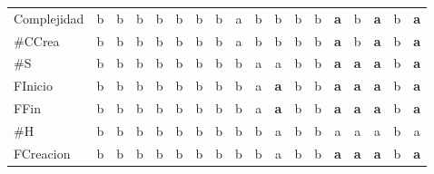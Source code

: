 {\begin{longtable}{lccccccccccccccccc}
Complejidad & \color{grisclaro}b & \color{grisclaro}b & \color{grisclaro}b & \color{grisclaro}b & \color{grisclaro}b & \color{grisclaro}b & \color{grisclaro}b & a & \color{grisclaro}b & \color{grisclaro}b & \color{grisclaro}b & \color{grisclaro}b & \textbf{\color{azuldos}a} & \color{grisclaro}b & \textbf{\color{azuldos}a} & \color{grisclaro}b & \textbf{\color{azuldos}a} \\
\#CCrea & \color{grisclaro}b & \color{grisclaro}b & \color{grisclaro}b & \color{grisclaro}b & \color{grisclaro}b & \color{grisclaro}b & \color{grisclaro}b & a & \color{grisclaro}b & \color{grisclaro}b & \color{grisclaro}b & \color{grisclaro}b & \textbf{\color{azuldos}a} & \color{grisclaro}b & \textbf{\color{azuldos}a} & \color{grisclaro}b & \textbf{\color{azuldos}a} \\
\#S & \color{grisclaro}b & \color{grisclaro}b & \color{grisclaro}b & \color{grisclaro}b & \color{grisclaro}b & \color{grisclaro}b & \color{grisclaro}b & \color{grisclaro}b & a & a & \color{grisclaro}b & \color{grisclaro}b & \textbf{\color{azuldos}a} & \textbf{\color{azuldos}a} & \textbf{\color{azuldos}a} & \color{grisclaro}b & \textbf{\color{azuldos}a} \\
FInicio & \color{grisclaro}b & \color{grisclaro}b & \color{grisclaro}b & \color{grisclaro}b & \color{grisclaro}b & \color{grisclaro}b & \color{grisclaro}b & \color{grisclaro}b & a & \textbf{\color{azuldos}a} & \color{grisclaro}b & \color{grisclaro}b & \textbf{\color{azuldos}a} & \textbf{\color{azuldos}a} & \textbf{\color{azuldos}a} & \color{grisclaro}b & \textbf{\color{azuldos}a} \\
FFin & \color{grisclaro}b & \color{grisclaro}b & \color{grisclaro}b & \color{grisclaro}b & \color{grisclaro}b & \color{grisclaro}b & \color{grisclaro}b & \color{grisclaro}b & a & \textbf{\color{azuldos}a} & \color{grisclaro}b & \color{grisclaro}b & \textbf{\color{azuldos}a} & \textbf{\color{azuldos}a} & \textbf{\color{azuldos}a} & \color{grisclaro}b & \textbf{\color{azuldos}a} \\
\#H & \color{grisclaro}b & \color{grisclaro}b & \color{grisclaro}b & \color{grisclaro}b & \color{grisclaro}b & \color{grisclaro}b & \color{grisclaro}b & \color{grisclaro}b & \color{grisclaro}b & a & \color{grisclaro}b & \color{grisclaro}b & a & a & a & \color{grisclaro}b & a \\
FCreacion & \color{grisclaro}b & \color{grisclaro}b & \color{grisclaro}b & \color{grisclaro}b & \color{grisclaro}b & \color{grisclaro}b & \color{grisclaro}b & \color{grisclaro}b & \color{grisclaro}b & a & \color{grisclaro}b & \color{grisclaro}b & \textbf{\color{azuldos}a} & \textbf{\color{azuldos}a} & \textbf{\color{azuldos}a} & \color{grisclaro}b & \textbf{\color{azuldos}a} \\

\end{longtable}}

